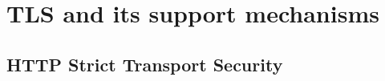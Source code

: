 \section{TLS and its support mechanisms}
\label{section:TLS}

\subsection{HTTP Strict Transport Security}
\label{subsection:HSTS}


